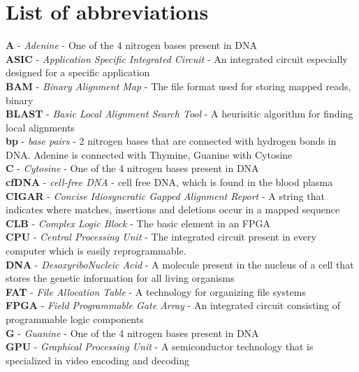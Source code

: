 \chapter*{List of abbreviations}


\textbf{A} - \textit{Adenine} - One of the 4 nitrogen bases present in DNA \\
\textbf{ASIC} - \textit{Application Specific Integrated Circuit} - An integrated circuit especially designed for a specific application \\
\textbf{BAM} - \textit{Binary Alignment Map} - The file format used for storing mapped reads, binary \\
\textbf{BLAST} - \textit{Basic Local Alignment Search Tool} - A heurisitic algorithm for finding local alignments\\
\textbf{bp} - \textit{base pairs} - 2 nitrogen bases that are connected with hydrogen bonds in DNA. Adenine is connected with Thymine, Guanine with Cytosine \\
\textbf{C} - \textit{Cytosine} - One of the 4 nitrogen bases present in DNA \\
\textbf{cfDNA} - \textit{cell-free DNA} - cell free DNA, which is found in the blood plasma \\
\textbf{CIGAR} - \textit{Concise Idiosyncratic Gapped Alignment Report} - A string that indicates where matches, insertions and deletions occur in a mapped sequence \\
\textbf{CLB} - \textit{Complex Logic Block} - The basic element in an FPGA \\
\textbf{CPU} - \textit{Central Processing Unit} - The integrated circuit present in every computer which is easily reprogrammable. \\
\textbf{DNA} - \textit{DesoxyriboNucleic Acid} - A molecule present in the nucleus of a cell  that stores the genetic information for all living organisms \\
\textbf{FAT} - \textit{File Allocation Table} - A technology for organizing file systems \\
\textbf{FPGA} - \textit{Field Programmable Gate Array} - An integrated circuit consisting of programmable logic components \\
\textbf{G} - \textit{Guanine} - One of the 4 nitrogen bases present in DNA \\
\textbf{GPU} - \textit{Graphical Processing Unit} - A semiconductor technology that is specialized in video encoding and decoding \\
